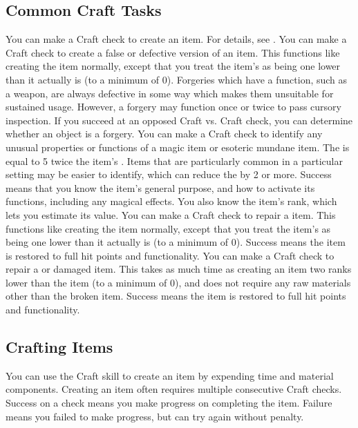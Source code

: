     \subsection{Common Craft Tasks}\label{Common Craft Tasks}
         You can make a Craft check to create an item.
        For details, see .
         You can make a Craft check to create a false or defective version of an item.
        This functions like creating the item normally, except that you treat the item's  as being one lower than it actually is (to a minimum of 0).
        Forgeries which have a function, such as a weapon, are always defective in some way which makes them unsuitable for sustained usage.
        However, a forgery may function once or twice to pass cursory inspection.
         If you succeed at an opposed Craft vs. Craft check, you can determine whether an object is a forgery.
         You can make a Craft check to identify any unusual properties or functions of a magic item or esoteric mundane item.
        The  is equal to 5 \add twice the item's .
        Items that are particularly common in a particular setting may be easier to identify, which can reduce the  by 2 or more.
        Success means that you know the item's general purpose, and how to activate its functions, including any magical effects.
        You also know the item's rank, which lets you estimate its value.
         You can make a Craft check to repair a  item. This functions like creating the item normally, except that you treat the item's  as being one lower than it actually is (to a minimum of 0).
        Success means the item is restored to full hit points and functionality.
         You can make a Craft check to repair a  or damaged item. This takes as much time as creating an item two ranks lower than the item (to a minimum of 0), and does not require any raw materials other than the broken item.
        Success means the item is restored to full hit points and functionality.

    \subsection{Crafting Items}\label{Crafting Items}
        You can use the Craft skill to create an item by expending time and material components. Creating an item often requires multiple consecutive Craft checks. Success on a check means you make progress on completing the item. Failure means you failed to make progress, but can try again without penalty.


